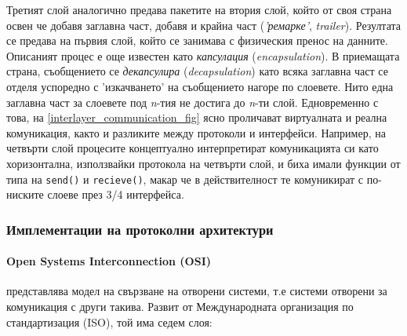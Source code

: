 \documentclass[12pt,a4paper,oneside]{book}
\begin{document}
Третият слой аналогично предава пакетите на втория слой, който от своя страна
освен че добавя заглавна част, добавя и крайна част (\textit{'ремарке'}, \textit{trailer}). Резултата
се предава на първия слой, който се занимава с физическия пренос на данните.
Описаният процес е още известен като \textit{капсулация} (\textit{encapsulation}). В
приемащата страна, съобщението се \textit{декапсулира} (\textit{decapsulation}) като
всяка заглавна част се отделя успоредно с 'изкачването' на съобщението нагоре по
слоевете. Нито една заглавна част за слоевете под \textit{n}-тия не достига до
\textit{n}-ти слой. Едновременно с това, на
\autoref{interlayer_communication_fig} ясно проличават виртуалната и реална
комуникация, както и разликите между протоколи и интерфейси. Например, на
четвърти слой процесите концептуално интерпретират комуникацията си като
хоризонтална, използвайки протокола на четвърти слой, и биха имали функции от типа
на \texttt{send()} и \texttt{recieve()}, макар че в действителност те
комуникират с по-ниските слоеве през 3/4 интерфейса.

\subsubsection{Имплементации на протоколни архитектури}

\paragraph{Open Systems Interconnection (OSI)} представлява модел на свързване
на отворени системи, т.е системи отворени за комуникация с други такива.
Развит от Международната организация по стандартизация (ISO), той
има седем слоя:
\end{document}
